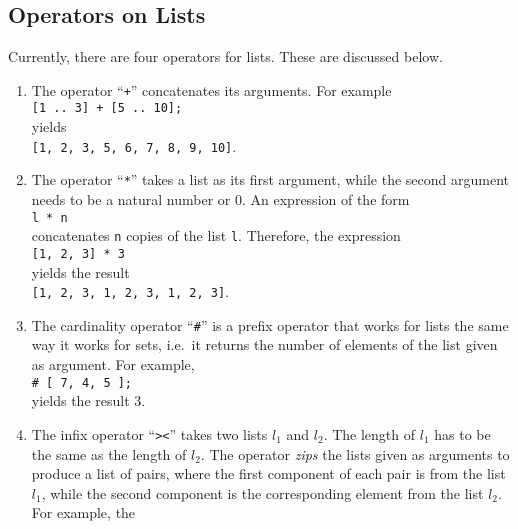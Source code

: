 \subsection{Operators on Lists}
Currently, there are four operators for lists.  These are discussed below.
\begin{enumerate}
\item The operator ``\texttt{+}'' concatenates its arguments.  For example
      \\[0.2cm]
      \hspace*{1.3cm}
      \texttt{[1 .. 3] + [5 .. 10];}
      \\[0.2cm]
      yields 
      \\[0.2cm]
      \hspace*{1.3cm}
      \texttt{[1, 2, 3, 5, 6, 7, 8, 9, 10]}.
\item The operator ``\texttt{*}'' takes a list as its first argument,  while the second argument
      needs to be a natural number or $0$.  An expression of the form 
      \\[0.2cm]
      \hspace*{1.3cm}
      \texttt{l * n}
      \\[0.2cm]
      concatenates \texttt{n} copies of the list \texttt{l}.  Therefore, the expression
      \\[0.2cm]
      \hspace*{1.3cm}
      \texttt{[1, 2, 3] * 3}
      \\[0.2cm]
      yields the result
      \\[0.2cm]
      \hspace*{1.3cm}
      \texttt{[1, 2, 3, 1, 2, 3, 1, 2, 3]}.
\item The cardinality operator ``\texttt{\#}'' is a prefix operator that works for lists the same
      way it works for sets, i.e.~it returns the number of elements of the list given as argument.  For example,
      \\[0.2cm]
      \hspace*{1.3cm}
      \texttt{\# [ 7, 4, 5 ];}
      \\[0.2cm]
      yields the result $3$.
\item The infix operator ``\texttt{><}'' takes two lists $l_1$ and $l_2$.  The length of $l_1$ has
      to be the same as the length of $l_2$.  The operator \emph{zips} the lists given as arguments
      to produce a list of pairs, where the first component of each  pair is from the list $l_1$,
      while the second component is the corresponding element from the list $l_2$.  For example, the

\end{enumerate}
